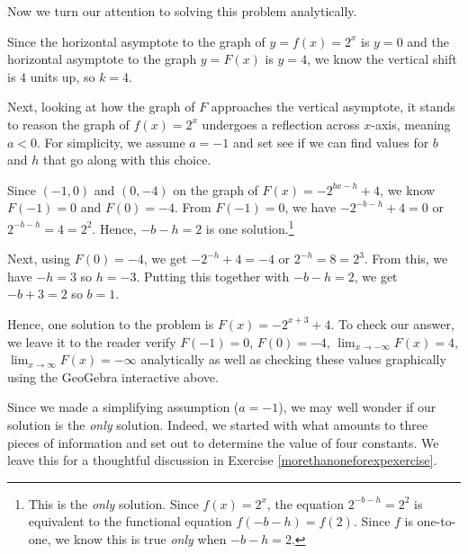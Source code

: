 \documentclass{ximera}
\begin{document}
\begin{example}
\begin{explanation}
\begin{enumerate}

\begin{center}
\end{center}

Now we turn our attention to solving this problem analytically.

Since the horizontal asymptote to the graph of $y=f(x) = 2^{x}$ is $y=0$ and the horizontal asymptote to the graph $y = F(x)$ is $y=4$, we know the vertical shift is $4$ units up, so $k = 4$.  

Next, looking at how the graph of $F$ approaches the vertical asymptote, it stands to reason  the graph of $f(x) = 2^{x}$ undergoes a reflection across  $x$-axis,  meaning $a<0$.   For simplicity, we assume  $a = -1$ and set see if we can find values for  $b$ and $h$ that go along with this choice.

 

Since  $(-1,0)$ and $(0,-4)$ on the graph of $F(x) = - 2^{bx-h} + 4$, we know $F(-1) = 0$ and $F(0) = -4$.  From $F(-1)=0$, we have $-2^{-b-h} +4= 0$ or $2^{-b-h} = 4 = 2^2$. Hence, $-b-h = 2$ is one solution.\footnote{This is the \textit{only} solution. Since $f(x) = 2^{x}$, the equation $2^{-b-h} =  2^2$ is equivalent to the functional equation $f(-b-h) = f(2)$.  Since $f$ is one-to-one, we know this is true \textit{only} when $-b-h = 2$.}

 

Next, using $F(0) = -4$, we get $-2^{-h} +4 = -4$ or $2^{-h} = 8 = 2^{3}$.  From this, we have $-h = 3$ so $h = -3$.  Putting this together with $-b-h = 2$, we get $-b+3 = 2$ so $b = 1$.

 

Hence, one solution to the problem is $F(x) = -2^{x+3} + 4$.  To check our answer, we leave it to the reader verify $F(-1) = 0$, $F(0) = -4$, $\lim_{x \rightarrow -\infty} F(x) = 4$, $\lim_{x \rightarrow \infty} F(x) = -\infty$ analytically as well as checking these values graphically using the GeoGebra interactive above.



Since we made a simplifying assumption ($a = -1$), we may well wonder if our solution is the  \textit{only} solution.  Indeed, we started with what amounts to three pieces of information and set out to determine the value of four constants.  We leave this for a thoughtful discussion in Exercise \ref{morethanoneforexpexercise}.

\end{enumerate}
\end{explanation}
\end{example}
\end{document}
